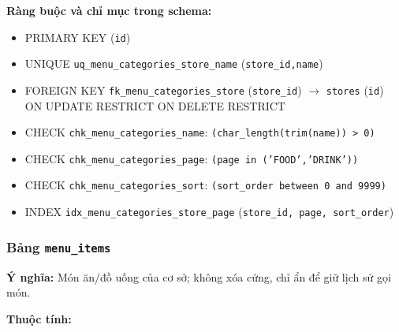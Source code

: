\textbf{Ràng buộc và chỉ mục trong schema:}

\begin{itemize}

\item PRIMARY KEY (\texttt{id})

\item UNIQUE \texttt{uq\_menu\_categories\_store\_name} (\texttt{store\_id,name})

\item FOREIGN KEY \texttt{fk\_menu\_categories\_store} (\texttt{store\_id}) $\rightarrow$ \texttt{stores} (\texttt{id}) ON UPDATE RESTRICT ON DELETE RESTRICT

\item CHECK \texttt{chk\_menu\_categories\_name}: \texttt{(char\_length(trim(name)) > 0)}

\item CHECK \texttt{chk\_menu\_categories\_page}: \texttt{(page in ('FOOD','DRINK'))}

\item CHECK \texttt{chk\_menu\_categories\_sort}: \texttt{(sort\_order between 0 and 9999)}

\item INDEX \texttt{idx\_menu\_categories\_store\_page} (\texttt{store\_id, page, sort\_order})

\end{itemize}

\subsubsection{Bảng \texttt{menu\_items}}

\textbf{Ý nghĩa:} Món ăn/đồ uống của cơ sở; không xóa cứng, chỉ ẩn để giữ lịch sử gọi món.\par

\textbf{Thuộc tính:}

